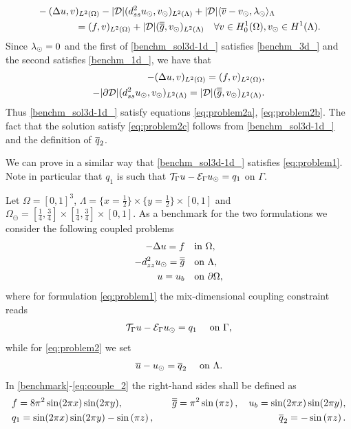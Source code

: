 \documentclass[r]{siamart171218}
\begin{document}
{\begin{align*}
&-(\Delta u, v)_{L^2(\Omega)} - |{\cal D}|(d^2_{ss} \ud, \vd)_{L^2(\Lambda)} 
+ |{\cal D}|\langle \avrc{v}  - \vd, \ld \rangle_\Lambda
\\
\nonumber
&\qquad\qquad= (f,v)_{L^2(\Omega)} + |{\cal D}| (\avrd{g},\vd)_{L^2(\Lambda)}
\quad \forall v \in H^1_0(\Omega), \vd \in H^1(\Lambda).
\end{align*}
Since $\lambda_{\odot}=0$ and the first of \eqref{benchm_sol3d-1d_} satisfies \eqref{benchm_3d_} and the second satisfies \eqref{benchm_1d_}, we have that
\begin{align*}
-(\Delta u, v)_{L^2(\Omega)} =  (f,v)_{L^2(\Omega)}, 
\\
-|{\partial \cal D}|(d^2_{ss} \ud, \vd)_{L^2(\Lambda)}  = |{\cal D}| (\avrd{g},\vd)_{L^2(\Lambda)}.
\end{align*}
Thus \eqref{benchm_sol3d-1d_} satisfy equations \eqref{eq:problem2a}, \eqref{eq:problem2b}.
The fact that the solution satisfy \eqref{eq:problem2c} follows from \eqref{benchm_sol3d-1d_} and the definition of $\overline{q}_2$.

We can prove in a similar way that \eqref{benchm_sol3d-1d_}
satisfies \eqref{eq:problem1}. Note in particular that $q_1$ is such that
${\mathcal{T}_\Gamma}{u} - \mathcal{E}_\Gamma{u_{\odot}} = q_1$ on $\Gamma$.\\
}
Let $\Omega=[0,1]^3$, $\Lambda=\{x=\tfrac{1}{2}\}\times \{y=\tfrac{1}{2}\} \times [0,1] $
and $\Omega_{\ominus}=[\tfrac{1}{4}, \tfrac{3}{4}]\times [\tfrac{1}{4}, \tfrac{3}{4}]\times [0, 1]$.
As a benchmark for the two formulations we consider the following coupled problems
%
\begin{subequations}\label{benchmark}
\begin{align}
\label{benchm_3d}
-\Delta u=f \quad &\text{in $\Omega$},\\
\label{benchm_1d}
-d_{zz}^2 \ud =\avrd{g} \quad &\text{on $\Lambda$},\\
u=u_b \quad &\text{on $\partial \Omega$},
\end{align}
\end{subequations}
where for formulation \eqref{eq:problem1} the mix-dimensional coupling constraint reads
\begin{equation}
  \label{eq:couple_1}
\trace{u} - \ext{\ud} = q_1\quad\text{ on }\Gamma,
\end{equation}
while for \eqref{eq:problem2} we set
\begin{equation}
    \label{eq:couple_2}
\avrc{u} - \ud = \avrc{q}_2\quad\text{ on }\Lambda.
\end{equation}
%
In \eqref{benchmark}-\eqref{eq:couple_2} the right-hand sides shall be defined as 
\begin{eqnarray*}
  &f=8\pi ^2 \sin (2\pi x) \sin (2\pi y),\quad &\overline{\overline{g}}={\pi ^2}\sin \left({\pi z}\right),\quad u_b=\sin (2\pi x) \sin (2\pi y),\\
  &q_1=\sin (2\pi x) \sin (2\pi y) - \sin \left({\pi z}\right),\quad &\overline{q}_2=-\sin \left({\pi z}\right).
\end{eqnarray*}
\end{document}
